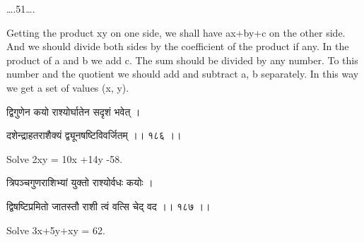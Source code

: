\documentclass[]{article}
\date{}
\begin{document}
{\ldots{}.51\ldots{}.}

{Getting the product xy on one side, we shall have ax+by+c on the other
side. And we should divide both sides by the coefficient of the product
if any. In the product of a and b we add c. The sum should be divided by
any number. To this number and the quotient we should add and subtract
a, b separately. In this way we get a set of values (x, y).}

{द्विगुणेन कयो राश्योर्घातेन सदृशं भवेत् । }

{दशेन्द्राहतराशैक्यं द्व्यूनषष्टिविवर्जितम् ।। १८६ ।। }

{Solve 2xy = 10x +14y -58.}

{त्रिपञ्चगुणराशिभ्यां युक्तो राश्योर्वधः कयोः । }

{द्विषष्टिप्रमितो जातस्तौ राशी त्वं वत्सि चेद् वद ।। १८७ ।। }

{Solve 3x+5y+xy = 62.}
\end{document}
